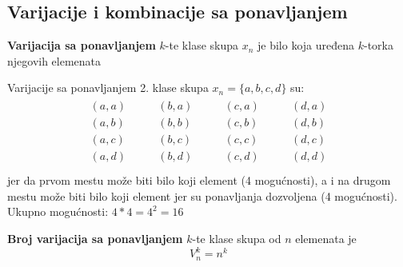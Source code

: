 \subsection{Varijacije i kombinacije sa ponavljanjem}
\begin{definition}
	\textbf{Varijacija sa ponavljanjem} $k$-te klase skupa $x_n$ je bilo koja uređena $k$-torka njegovih elemenata
\end{definition}
\begin{example}
	Varijacije sa ponavljanjem 2. klase skupa $x_n = \{a,b,c,d\}$ su:
	\begin{align*}
		\begin{aligned}
			(a,a)\\
			(a,b)\\
			(a,c)\\
			(a,d)\\
		\end{aligned}
		\quad \quad
		\begin{aligned}
			(b,a)\\
			(b,b)\\
			(b,c)\\
			(b,d)\\
		\end{aligned}
		\quad \quad
		\begin{aligned}
			(c,a)\\
			(c,b)\\
			(c,c)\\
			(c,d)\\
		\end{aligned}
		\quad \quad
		\begin{aligned}
			(d,a)\\
			(d,b)\\
			(d,c)\\
			(d,d)\\
		\end{aligned}
	\end{align*}
	jer da prvom mestu može biti bilo koji element (4 mogućnosti), a i na drugom mestu može biti bilo koji element jer su ponavljanja dozvoljena (4 mogućnosti).\\
	Ukupno mogućnosti: $4*4 = 4^2 = 16$
\end{example}
\begin{theorem}
	\textbf{Broj varijacija sa ponavljanjem} $k$-te klase skupa od $n$ elemenata je $$V_n^k = n^k$$
\end{theorem}

